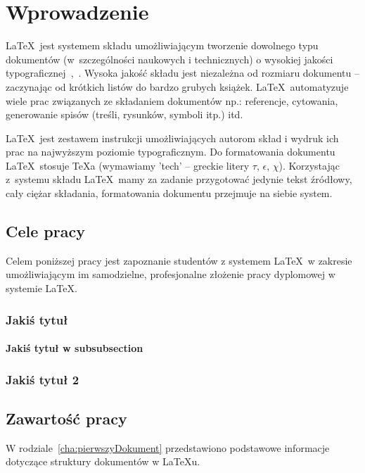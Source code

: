 \chapter{Wprowadzenie}
\label{cha:wprowadzenie}

\LaTeX~jest systemem składu umożliwiającym tworzenie dowolnego typu dokumentów (w~szczególności naukowych i technicznych) o wysokiej jakości typograficznej~\cite{Dil00},~\cite{Lam92}. Wysoka jakość składu jest niezależna od rozmiaru dokumentu -- zaczynając od krótkich listów do bardzo grubych książek. \LaTeX~automatyzuje wiele prac związanych ze składaniem dokumentów np.: referencje, cytowania, generowanie spisów (treśli, rysunków, symboli itp.) itd.

\LaTeX~jest zestawem instrukcji umożliwiających autorom skład i wydruk ich prac na najwyższym poziomie typograficznym. Do formatowania dokumentu \LaTeX~stosuje \TeX a (wymawiamy 'tech' -- greckie litery $\tau$, $\epsilon$, $\chi$). Korzystając z~systemu składu \LaTeX~mamy za zadanie przygotować jedynie tekst źródłowy, cały ciężar składania, formatowania dokumentu przejmuje na siebie system.





\section{Cele pracy}
\label{sec:celePracy}

Celem poniższej pracy jest zapoznanie studentów z systemem \LaTeX~w zakresie umożliwiającym im samodzielne, profesjonalne złożenie pracy dyplomowej w systemie \LaTeX.


\subsection{Jakiś tytuł}


\subsubsection{Jakiś tytuł w subsubsection}

\subsection{Jakiś tytuł 2}


\section{Zawartość pracy}
\label{sec:zawartoscPracy}

W rodziale~\ref{cha:pierwszyDokument} przedstawiono podstawowe informacje dotyczące struktury dokumentów w \LaTeX u.

